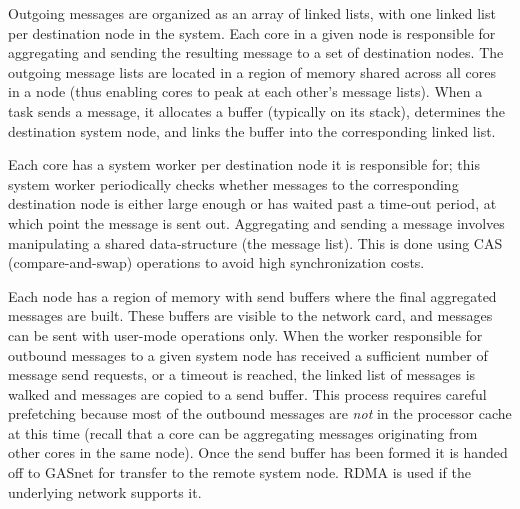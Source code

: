 Outgoing messages are organized as an array of linked lists, with one linked
list per destination node in the system. Each core in a given node is
responsible for aggregating and sending the resulting message to a set of
destination nodes. The outgoing message lists are located in a region of
memory shared across all cores in a \Grappa node (thus enabling cores to peak
at each other's message lists). When a task sends a message, it allocates a buffer (typically on its stack),  determines the destination system
node, and links the buffer into the corresponding linked list.

Each core has a system worker per destination node it is responsible for; this
system worker periodically checks whether messages to the corresponding
destination node is either large enough or has waited past a time-out period,
at which point the message is sent out. Aggregating and sending a message
involves manipulating a shared data-structure (the message list). This is done
using CAS (compare-and-swap) operations to avoid high synchronization costs. 


Each node has a region of memory with send buffers where the final aggregated
messages are built. These buffers are visible to the network card, and
messages can be sent with user-mode operations only. When the worker
responsible for outbound messages to a given system node has received a
sufficient number of message send requests, or a timeout is reached, the
linked list of messages is walked and messages are copied to a send buffer.
This process requires careful prefetching because most of the outbound
messages are \emph{not} in the processor cache at this time (recall that a
core can be aggregating messages originating from other cores in the same
node). Once the send buffer has been formed it is handed off to GASnet for
transfer to the remote system node. RDMA is used if the underlying network
supports it. 

